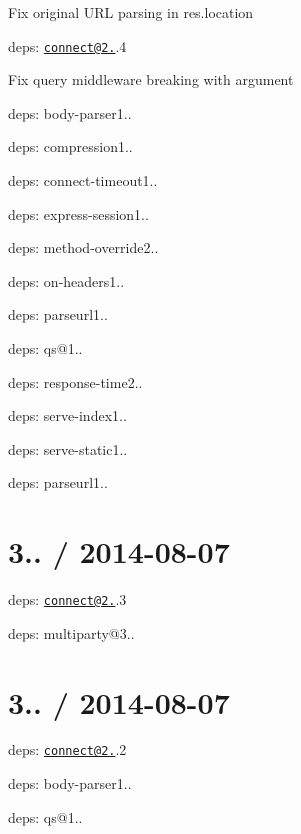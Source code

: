 {\ttfamily 
\begin{DoxyItemize}
\item Fix original U\+RL parsing in {\ttfamily res.\+location}
\item deps\+: \href{mailto:connect@2.25}{\tt connect@2.}.4
\begin{DoxyItemize}
\item Fix {\ttfamily query} middleware breaking with argument
\item deps\+: body-\/parser1..
\item deps\+: compression1..
\item deps\+: connect-\/timeout1..
\item deps\+: express-\/session1..
\item deps\+: method-\/override2..
\item deps\+: on-\/headers1..
\item deps\+: parseurl1..
\item deps\+: qs@1..
\item deps\+: response-\/time2..
\item deps\+: serve-\/index1..
\item deps\+: serve-\/static1..
\end{DoxyItemize}
\item deps\+: parseurl1..
\end{DoxyItemize}}

{\ttfamily \section*{3.. / 2014-\/08-\/07 }}

{\ttfamily }

{\ttfamily 
\begin{DoxyItemize}
\item deps\+: \href{mailto:connect@2.25}{\tt connect@2.}.3
\begin{DoxyItemize}
\item deps\+: multiparty@3..
\end{DoxyItemize}
\end{DoxyItemize}}

{\ttfamily \section*{3.. / 2014-\/08-\/07 }}

{\ttfamily }

{\ttfamily 
\begin{DoxyItemize}
\item deps\+: \href{mailto:connect@2.25}{\tt connect@2.}.2
\begin{DoxyItemize}
\item deps\+: body-\/parser1..
\item deps\+: qs@1..
\end{DoxyItemize}
\end{DoxyItemize}}

